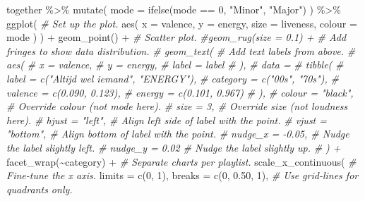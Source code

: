 \documentclass[
]{article}
\newenvironment{Shaded}{\begin{snugshade}}{\end{snugshade}}
\newcommand{\AttributeTok}[1]{\textcolor[rgb]{0.77,0.63,0.00}{#1}}
\newcommand{\CommentTok}[1]{\textcolor[rgb]{0.56,0.35,0.01}{\textit{#1}}}
\newcommand{\DecValTok}[1]{\textcolor[rgb]{0.00,0.00,0.81}{#1}}
\newcommand{\FloatTok}[1]{\textcolor[rgb]{0.00,0.00,0.81}{#1}}
\newcommand{\FunctionTok}[1]{\textcolor[rgb]{0.00,0.00,0.00}{#1}}
\newcommand{\NormalTok}[1]{#1}
\newcommand{\SpecialCharTok}[1]{\textcolor[rgb]{0.00,0.00,0.00}{#1}}
\newcommand{\StringTok}[1]{\textcolor[rgb]{0.31,0.60,0.02}{#1}}
\begin{document}
\begin{Shaded}
\begin{Highlighting}[]
\NormalTok{together }\SpecialCharTok{\%\textgreater{}\%}                    
  \FunctionTok{mutate}\NormalTok{(}
    \AttributeTok{mode =} \FunctionTok{ifelse}\NormalTok{(mode }\SpecialCharTok{==} \DecValTok{0}\NormalTok{, }\StringTok{"Minor"}\NormalTok{, }\StringTok{"Major"}\NormalTok{)}
\NormalTok{  ) }\SpecialCharTok{\%\textgreater{}\%}
  \FunctionTok{ggplot}\NormalTok{(                     }\CommentTok{\# Set up the plot.}
    \FunctionTok{aes}\NormalTok{(}
      \AttributeTok{x =}\NormalTok{ valence,}
      \AttributeTok{y =}\NormalTok{ energy,}
      \AttributeTok{size =}\NormalTok{ liveness,}
      \AttributeTok{colour =}\NormalTok{ mode}
\NormalTok{    )}
\NormalTok{  ) }\SpecialCharTok{+} \FunctionTok{geom\_point}\NormalTok{() }\SpecialCharTok{+}              \CommentTok{\# Scatter plot.}
  \CommentTok{\#geom\_rug(size = 0.1) +      \# Add \textquotesingle{}fringes\textquotesingle{} to show data distribution.}
  \CommentTok{\# geom\_text(                  \# Add text labels from above.}
  \CommentTok{\#   aes(}
  \CommentTok{\#     x = valence,}
  \CommentTok{\#     y = energy,}
  \CommentTok{\#     label = label}
  \CommentTok{\#   ),}
  \CommentTok{\#   data = }
  \CommentTok{\#     tibble(}
  \CommentTok{\#       label = c("Altijd wel iemand", "ENERGY"),}
  \CommentTok{\#       category = c("00s", "70s"),}
  \CommentTok{\#       valence = c(0.090, 0.123),}
  \CommentTok{\#       energy = c(0.101, 0.967)}
  \CommentTok{\#     ),}
  \CommentTok{\#   colour = "black",         \# Override colour (not mode here).}
  \CommentTok{\#   size = 3,                 \# Override size (not loudness here).}
  \CommentTok{\#   hjust = "left",           \# Align left side of label with the point.}
  \CommentTok{\#   vjust = "bottom",         \# Align bottom of label with the point.}
  \CommentTok{\#   nudge\_x = {-}0.05,          \# Nudge the label slightly left.}
  \CommentTok{\#   nudge\_y = 0.02            \# Nudge the label slightly up.}
  \CommentTok{\# ) +}
  \FunctionTok{facet\_wrap}\NormalTok{(}\SpecialCharTok{\textasciitilde{}}\NormalTok{category) }\SpecialCharTok{+}     \CommentTok{\# Separate charts per playlist.}
  \FunctionTok{scale\_x\_continuous}\NormalTok{(         }\CommentTok{\# Fine{-}tune the x axis.}
    \AttributeTok{limits =} \FunctionTok{c}\NormalTok{(}\DecValTok{0}\NormalTok{, }\DecValTok{1}\NormalTok{),}
    \AttributeTok{breaks =} \FunctionTok{c}\NormalTok{(}\DecValTok{0}\NormalTok{, }\FloatTok{0.50}\NormalTok{, }\DecValTok{1}\NormalTok{),   }\CommentTok{\# Use grid{-}lines for quadrants only.}

\end{Highlighting}
\end{Shaded}
\end{document}
